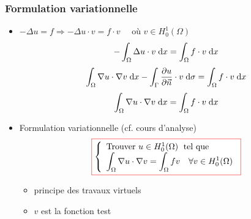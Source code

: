 \documentclass{beamer}
\def \de {{\rm d}}
\newcommand{\myredbox}[1]{\fcolorbox{red}{white}{$\displaystyle#1$}}
\begin{document}
\begin{frame}
\frametitle{Formulation variationnelle}
\begin{itemize}
\item $-\Delta u = f  \Longrightarrow -\Delta u \cdot v= f \cdot v \quad \mbox{ où }v\in H_0^1(\Omega)$
\[\displaystyle -\int_{\Omega}\Delta u \cdot v \; \de x= \int_{\Omega}f \cdot v \; \de x\]
\[ \int_\Omega \nabla u\cdot \nabla v \; \de x-\int_\Gamma  \frac{\partial u}{\partial \vec n} \cdot v \; \de \sigma = \int_{\Omega}f \cdot v \; \de x\]
\[ \int_\Omega \nabla u\cdot \nabla v \; \de x = \int_{\Omega}f \cdot v \; \de x\]
\item Formulation variationnelle (cf. cours d'analyse)
\begin{equation}
\myredbox{
\left\{
\begin{array}{l}
\mbox{Trouver } u \in H_0^1(\Omega)\;\mbox{ tel que }\\
\displaystyle \int_{\Omega}\nabla u\cdot \nabla v = \int_{\Omega}f v \quad \forall v\in H_0^1(\Omega) 
\end{array}
\right.}
\label{formVar1}
\end{equation}
\begin{itemize}
\item principe des travaux virtuels
\item $v$ est la fonction test
\end{itemize}

\end{itemize}


\end{frame}
\end{document}
